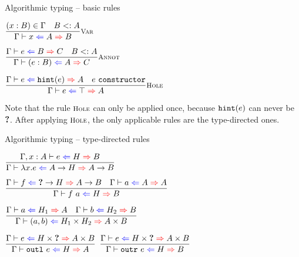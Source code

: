 \documentclass{beamer}
\begin{document}
\begin{frame}{Algorithmic typing -- basic rules}

\begin{center}
  $\infrule[Var]{\sidecond{(x : B) \in \Gamma} \quad \sidecond{\subtyping{B}{A}}}{\hinting{x}{A}{B}}$

  \vspace{2em}

  $\infrule[Annot]{\hinting{e}{B}{C} \quad \sidecond{\subtyping{B}{A}}}{\hinting{\annot{e}{B}}{A}{C}}$

  \vspace{2em}

  $\infrule[Hole]{\hinting{e}{\hintfor{e}}{A} \quad \sidecond{e\ \texttt{constructor}}}{\hinting{e}{\Top}{A}}$
\end{center}

\vspace{2em}

Note that the rule $\textsc{\footnotesize{Hole}}$ can only be applied once, because $\texttt{hint}(e)$ can never be $\textbf{?}$. After applying $\textsc{\footnotesize{Hole}}$, the only applicable rules are the type-directed ones.

\end{frame}

\begin{frame}{Algorithmic typing -- type-directed rules}

\begin{center}
  $\infrule{\fullhinting{\extend{\Gamma}{x}{A}}{e}{H}{B}}{\hinting{\fun{x}{e}}{\Fun{A}{H}}{\Fun{A}{B}}}$

  \vspace{1em}

  $\infrule{\hinting{f}{\Fun{\Hole}{H}}{\Fun{A}{B}} \quad \hinting{a}{A}{A}}{\hinting{\app{f}{a}}{H}{B}}$

  \vspace{1em}

  $\infrule{\hinting{a}{H_1}{A} \quad \hinting{b}{H_2}{B}}{\hinting{\pair{a}{b}}{\Prod{H_1}{H_2}}{\Prod{A}{B}}}$

  \vspace{1em}

  $\infrule{\hinting{e}{\Prod{H}{\Hole}}{\Prod{A}{B}}}{\hinting{\outl{e}}{H}{A}}$ \quad
  $\infrule{\hinting{e}{\Prod{H}{\Hole}}{\Prod{A}{B}}}{\hinting{\outr{e}}{H}{B}}$
\end{center}

\end{frame}
\end{document}
